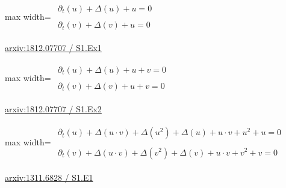 \documentclass[10pt,a4paper]{article}
\begin{document}
\begin{minipage}{\linewidth}
\begin{center}\begin{adjustbox}{max width=\linewidth}$\displaystyle\begin{gathered}\begin{gathered}\partial_{t}(u)+\Delta(u)+u=0\end{gathered}\\[5pt]\begin{gathered}\partial_{t}(v)+\Delta(v)+u=0\end{gathered}\end{gathered}$\end{adjustbox}\end{center}
{\small \href{https://arxiv.org/html/1812.07707#S1.Ex1}{arxiv:1812.07707 / S1.Ex1}}\par
\end{minipage}\par\vspace{7mm}

\begin{minipage}{\linewidth}
\begin{center}\begin{adjustbox}{max width=\linewidth}$\displaystyle\begin{gathered}\begin{gathered}\partial_{t}(u)+\Delta(u)+u+v=0\end{gathered}\\[5pt]\begin{gathered}\partial_{t}(v)+\Delta(v)+u+v=0\end{gathered}\end{gathered}$\end{adjustbox}\end{center}
{\small \href{https://arxiv.org/html/1812.07707#S1.Ex2}{arxiv:1812.07707 / S1.Ex2}}\par
\end{minipage}\par\vspace{7mm}

\begin{minipage}{\linewidth}
\begin{center}\begin{adjustbox}{max width=\linewidth}$\displaystyle\begin{gathered}\begin{gathered}\partial_{t}(u)+\Delta(u\cdot v)+\Delta(u^{2})+\Delta(u)+u\cdot v+u^{2}+u=0\end{gathered}\\[5pt]\begin{gathered}\partial_{t}(v)+\Delta(u\cdot v)+\Delta(v^{2})+\Delta(v)+u\cdot v+v^{2}+v=0\end{gathered}\end{gathered}$\end{adjustbox}\end{center}
{\small \href{https://arxiv.org/html/1311.6828#S1.E1}{arxiv:1311.6828 / S1.E1}}\par
\end{minipage}\par\vspace{7mm}
\end{document}
